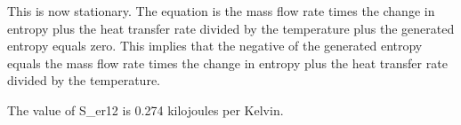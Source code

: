 This is now stationary. The equation is the mass flow rate times the change in entropy plus the heat transfer rate divided by the temperature plus the generated entropy equals zero. This implies that the negative of the generated entropy equals the mass flow rate times the change in entropy plus the heat transfer rate divided by the temperature. 

The value of S_er12 is 0.274 kilojoules per Kelvin.